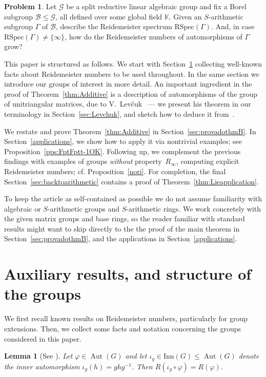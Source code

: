 \documentclass[a4paper,11pt]{amsart}
\numberwithin{equation}{section}
\theoremstyle{plain}
\newtheorem{lem}[thm]{Lemma}
\theoremstyle{definition}
\newtheorem{prob}[thm]{Problem}
\newcommand{\K}{\mathbb{K}}
\newcommand{\phee}{\varphi} %
\newcommand{\mc}{\mathcal}
\newcommand{\Ri}{R_{\infty}} %
\newcommand{\RSpec}{\mathrm{RSpec}}
\DeclareMathOperator{\Aut}{Aut}
\begin{document}
\begin{prob}
Let $\mc{G}$ be a split reductive linear algebraic group and fix a Borel subgroup $\mc{B} \leq \mc{G}$, all defined over some global field $\K$. Given an $S$-arithmetic subgroup $\Gamma$ of $\mc{B}$, describe the Reidemeister spectrum $\RSpec(\Gamma)$. And, in case $\RSpec(\Gamma) \neq \{\infty\}$, how do the Reidemeister numbers of automorphisms of $\Gamma$ grow?
\end{prob}

This paper is structured as follows. 
We start with Section~\ref{sec:LemmataRinfty} collecting well-known facts about Reidemeister numbers to be used throughout. In the same section we introduce our groups of interest in more detail. 
An important ingredient in the proof of Theorem~\ref{thm:Additive} is a description of automorphisms of the group of unitriangular matrices, due to V.~Lev\v{c}uk~\cite{LevchukOriginal} --- we present his theorem in our terminology in Section~\ref{sec:Levchuk}, and sketch how to deduce it from~\cite{LevchukOriginal}. 

We restate and prove Theorem~\ref{thm:Additive} in Section~\ref{sec:provadothmB}. In Section~\ref{applications}, we show how to apply it via nontrivial examples; see Proposition~\ref{pps:FptFptt-1OK}. 
Following up, we complement the previous findings with examples of groups \emph{without} property~$\Ri$, computing explicit Reidemeister numbers; cf. Proposition~\ref{nori}.  
For completion, the final Section~\ref{sec:backtoarithmetic} contains a proof of Theorem~\ref{thm:Lieapplication}. 

To keep the article as self-contained as possible 
we do not assume familiarity with 
algebraic or $S$-arithmetic groups and $S$-arithmetic rings.  
We work concretely with the given matrix groups and base rings, so the reader familiar with standard results might want to skip directly to the the proof of the main theorem in Section~\ref{sec:provadothmB}, and the applications in Section~\ref{applications}.

\section{Auxiliary results, and structure of the groups}
\label{sec:LemmataRinfty}
We first recall known results on Reidemeister numbers, particularly for group extensions. Then, we collect some facts and notation concerning the groups considered in this paper.

\begin{lem}[{See \cite[Cor.~2.5]{FelshtynTroitskyCrelle}}] \label{lem:ignoreinner}
Let $\phee \in \Aut(G)$ and let $\iota_g \in \mathrm{Inn}(G) \leq \Aut(G)$ denote the inner automorphism $\iota_g(h) = ghg^{-1}$. Then $R(\iota_g \circ \phee) = R(\phee)$.
\end{lem}
\end{document}
